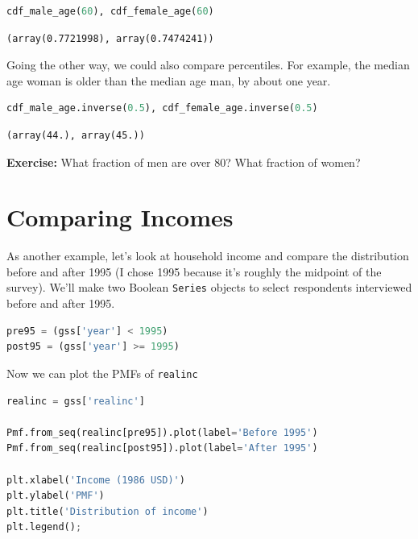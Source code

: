 \begin{lstlisting}[language=Python,style=source]
cdf_male_age(60), cdf_female_age(60)
\end{lstlisting}

\begin{lstlisting}[style=output]
(array(0.7721998), array(0.7474241))
\end{lstlisting}

Going the other way, we could also compare percentiles. For example, the
median age woman is older than the median age man, by about one year.

\begin{lstlisting}[language=Python,style=source]
cdf_male_age.inverse(0.5), cdf_female_age.inverse(0.5)
\end{lstlisting}

\begin{lstlisting}[style=output]
(array(44.), array(45.))
\end{lstlisting}

\textbf{Exercise:} What fraction of men are over 80? What fraction of
women?

\hypertarget{comparing-incomes}{%
\section{Comparing Incomes}\label{comparing-incomes}}

As another example, let's look at household income and compare the
distribution before and after 1995 (I chose 1995 because it's roughly
the midpoint of the survey). We'll make two Boolean
\passthrough{\lstinline!Series!} objects to select respondents
interviewed before and after 1995.

\begin{lstlisting}[language=Python,style=source]
pre95 = (gss['year'] < 1995)
post95 = (gss['year'] >= 1995)
\end{lstlisting}

Now we can plot the PMFs of \passthrough{\lstinline!realinc!}

\begin{lstlisting}[language=Python,style=source]
realinc = gss['realinc']

Pmf.from_seq(realinc[pre95]).plot(label='Before 1995')
Pmf.from_seq(realinc[post95]).plot(label='After 1995')

plt.xlabel('Income (1986 USD)')
plt.ylabel('PMF')
plt.title('Distribution of income')
plt.legend();
\end{lstlisting}

